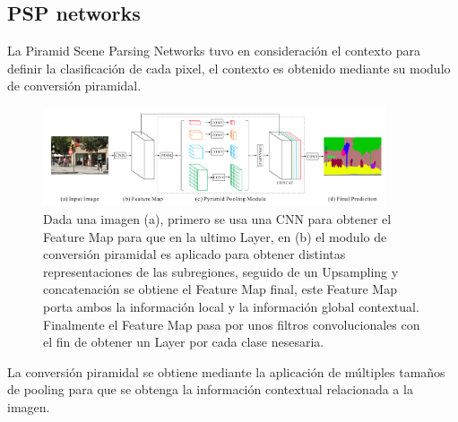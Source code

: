 \subsection{PSP networks}
La Piramid Scene Parsing Networks \cite{zhao2017pyramid} tuvo en consideración el contexto para definir la clasificación de cada pixel, el contexto es obtenido mediante su modulo de conversión piramidal.
\begin{figure}[H]
    \centering
    \includegraphics[width = 0.9\textwidth]{images/redes/pspnet.png}
    \caption[Arquitectura PSP]{ Dada una imagen (a), primero se usa una \gls{CNN} para obtener el \gls{Feature Map} para que en la ultimo \gls{Layer}, en (b) el modulo de conversión piramidal es aplicado para obtener distintas representaciones de las subregiones, seguido de un \gls{Upsampling} y concatenación se obtiene el \gls{Feature Map} final, este \gls{Feature Map} porta ambos la información local y la información global contextual. Finalmente el \gls{Feature Map} pasa por unos filtros convolucionales con el fin de obtener un \gls{Layer} por cada clase nesesaria.}
    \label{fig:my_label}
\end{figure}{}
La conversión piramidal se obtiene mediante la aplicación de múltiples tamaños de pooling para que se obtenga la información contextual relacionada a la imagen.

